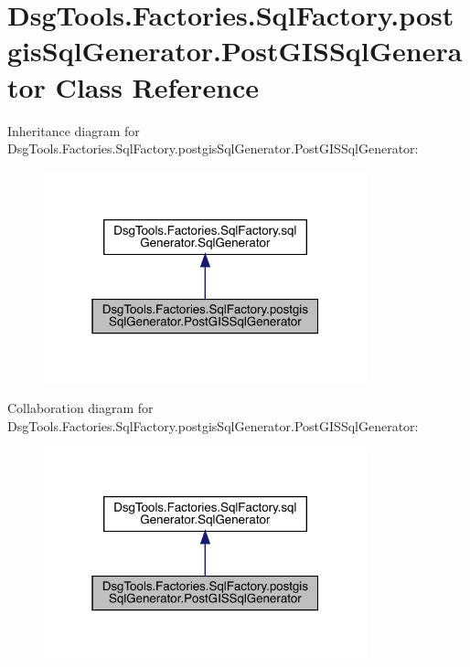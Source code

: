 \hypertarget{class_dsg_tools_1_1_factories_1_1_sql_factory_1_1postgis_sql_generator_1_1_post_g_i_s_sql_generator}{}\section{Dsg\+Tools.\+Factories.\+Sql\+Factory.\+postgis\+Sql\+Generator.\+Post\+G\+I\+S\+Sql\+Generator Class Reference}
\label{class_dsg_tools_1_1_factories_1_1_sql_factory_1_1postgis_sql_generator_1_1_post_g_i_s_sql_generator}


Inheritance diagram for Dsg\+Tools.\+Factories.\+Sql\+Factory.\+postgis\+Sql\+Generator.\+Post\+G\+I\+S\+Sql\+Generator\+:
\nopagebreak
\begin{figure}[H]
\begin{center}
\leavevmode
\includegraphics[width=265pt]{class_dsg_tools_1_1_factories_1_1_sql_factory_1_1postgis_sql_generator_1_1_post_g_i_s_sql_generator__inherit__graph}
\end{center}
\end{figure}


Collaboration diagram for Dsg\+Tools.\+Factories.\+Sql\+Factory.\+postgis\+Sql\+Generator.\+Post\+G\+I\+S\+Sql\+Generator\+:
\nopagebreak
\begin{figure}[H]
\begin{center}
\leavevmode
\includegraphics[width=265pt]{class_dsg_tools_1_1_factories_1_1_sql_factory_1_1postgis_sql_generator_1_1_post_g_i_s_sql_generator__coll__graph}
\end{center}
\end{figure}
